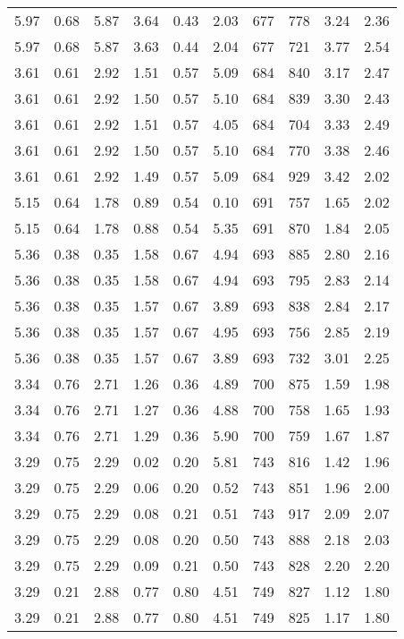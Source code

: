\begin{longtable}{rrrrrrrrrr}
5.97	&	0.68	&	5.87	&	3.64	&	0.43	&	2.03	&	677	&	778	&	3.24	&	2.36	\\
5.97	&	0.68	&	5.87	&	3.63	&	0.44	&	2.04	&	677	&	721	&	3.77	&	2.54	\\
3.61	&	0.61	&	2.92	&	1.51	&	0.57	&	5.09	&	684	&	840	&	3.17	&	2.47	\\
3.61	&	0.61	&	2.92	&	1.50	&	0.57	&	5.10	&	684	&	839	&	3.30	&	2.43	\\
3.61	&	0.61	&	2.92	&	1.51	&	0.57	&	4.05	&	684	&	704	&	3.33	&	2.49	\\
3.61	&	0.61	&	2.92	&	1.50	&	0.57	&	5.10	&	684	&	770	&	3.38	&	2.46	\\
3.61	&	0.61	&	2.92	&	1.49	&	0.57	&	5.09	&	684	&	929	&	3.42	&	2.02	\\
5.15	&	0.64	&	1.78	&	0.89	&	0.54	&	0.10	&	691	&	757	&	1.65	&	2.02	\\
5.15	&	0.64	&	1.78	&	0.88	&	0.54	&	5.35	&	691	&	870	&	1.84	&	2.05	\\
5.36	&	0.38	&	0.35	&	1.58	&	0.67	&	4.94	&	693	&	885	&	2.80	&	2.16	\\
5.36	&	0.38	&	0.35	&	1.58	&	0.67	&	4.94	&	693	&	795	&	2.83	&	2.14	\\
5.36	&	0.38	&	0.35	&	1.57	&	0.67	&	3.89	&	693	&	838	&	2.84	&	2.17	\\
5.36	&	0.38	&	0.35	&	1.57	&	0.67	&	4.95	&	693	&	756	&	2.85	&	2.19	\\
5.36	&	0.38	&	0.35	&	1.57	&	0.67	&	3.89	&	693	&	732	&	3.01	&	2.25	\\
3.34	&	0.76	&	2.71	&	1.26	&	0.36	&	4.89	&	700	&	875	&	1.59	&	1.98	\\
3.34	&	0.76	&	2.71	&	1.27	&	0.36	&	4.88	&	700	&	758	&	1.65	&	1.93	\\
3.34	&	0.76	&	2.71	&	1.29	&	0.36	&	5.90	&	700	&	759	&	1.67	&	1.87	\\
3.29	&	0.75	&	2.29	&	0.02	&	0.20	&	5.81	&	743	&	816	&	1.42	&	1.96	\\
3.29	&	0.75	&	2.29	&	0.06	&	0.20	&	0.52	&	743	&	851	&	1.96	&	2.00	\\
3.29	&	0.75	&	2.29	&	0.08	&	0.21	&	0.51	&	743	&	917	&	2.09	&	2.07	\\
3.29	&	0.75	&	2.29	&	0.08	&	0.20	&	0.50	&	743	&	888	&	2.18	&	2.03	\\
3.29	&	0.75	&	2.29	&	0.09	&	0.21	&	0.50	&	743	&	828	&	2.20	&	2.20	\\
3.29	&	0.21	&	2.88	&	0.77	&	0.80	&	4.51	&	749	&	827	&	1.12	&	1.80	\\
3.29	&	0.21	&	2.88	&	0.77	&	0.80	&	4.51	&	749	&	825	&	1.17	&	1.80	\\

\end{longtable}
